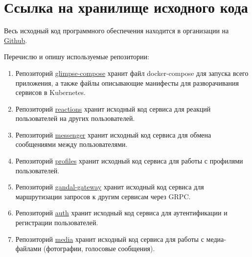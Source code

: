 \section{Ссылка на хранилище исходного кода}

Весь исходный код программного обеспечения находится в организации на \href{
      https://github.com/orgs/soulmate-dating/repositories}{Github}.

Перечислю и опишу используемые репозитории:
\begin{enumerate}
      \item Репозиторий \href{https://github.com/soulmate-dating/glimpse-compose}{glimpse-compose}
            хранит файл docker-compose для запуска всего приложения, а также файлы
            описывающие манифесты для разворачивания сервисов в Kubernetes.

      \item Репозиторий \href{https://github.com/soulmate-dating/reactions}{reactions}
            хранит исходный код сервиса для реакций пользователей на других пользователей.

      \item Репозиторий \href{https://github.com/soulmate-dating/messenger}{messenger}
            хранит исходный код сервиса для обмена сообщениями между пользователями.

      \item Репозиторий \href{https://github.com/soulmate-dating/profiles}
            {profiles}
            хранит исходный код сервиса для работы с профилями пользователей.

      \item Репозиторий \href{https://github.com/soulmate-dating/gandalf-gateway}{gandal-gateway}
            хранит исходный код сервиса для маршрутизации запросов к другим сервисам через GRPC.

      \item Репозиторий \href{https://github.com/soulmate-dating/auth}{auth}
            хранит исходный код сервиса для аутентификации и регистрации пользователей.

      \item Репозиторий \href{https://github.com/soulmate-dating/media}{media}
            хранит исходный код сервиса для работы с медиа-файлами (фотографии, голосовые сообщения).

\end{enumerate}